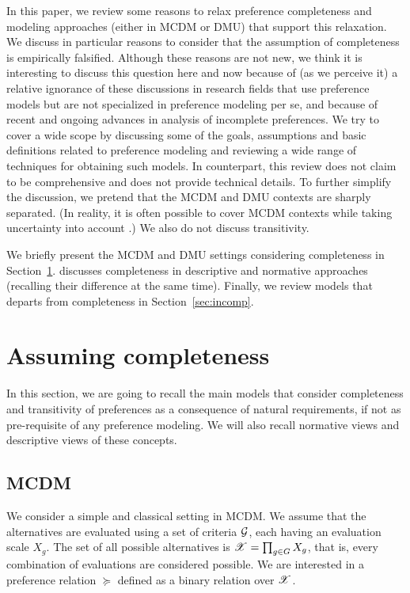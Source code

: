 \documentclass[french, english]{llncs}
\begin{document}
In this paper, we review some reasons to relax preference completeness and modeling approaches (either in MCDM or DMU) that support this relaxation. We discuss in particular reasons to consider that the assumption of completeness is empirically falsified. Although these reasons are not new, we think it is interesting to discuss this question here and now because of (as we perceive it) a relative ignorance of these discussions in research fields that use preference models but are not specialized in preference modeling per se, and because of recent and ongoing advances in analysis of incomplete preferences.
We try to cover a wide scope by discussing some of the goals, assumptions and basic definitions related to preference modeling and reviewing a wide range of techniques for obtaining such models. In counterpart, this review does not claim to be comprehensive and does not provide technical details. To further simplify the discussion, we pretend that the MCDM and DMU contexts are sharply separated. (In reality, it is often possible to cover MCDM contexts while taking uncertainty into account \citep{keeney_decisions_1993}.) We also do not discuss transitivity.

We briefly present the MCDM and DMU settings considering completeness in Section~\ref{sec:review}.  discusses completeness in descriptive and normative approaches (recalling their difference at the same time). Finally, we review models that departs from completeness in Section~\ref{sec:incomp}.
	
\section{Assuming completeness}\label{sec:review}
In this section, we are going to recall the main models that consider completeness and transitivity of preferences as a consequence of natural requirements, if not as pre-requisite of any preference modeling. We will also recall normative views and descriptive views of these concepts. 
	
\subsection{MCDM}
We consider a simple and classical setting in MCDM. We assume that the alternatives are evaluated using a set of criteria $\mathcal{G}$, each having an evaluation scale $X_g$. The set of all possible alternatives is $\mathscr{X} = \prod_{g \in G} X_g$, that is, every combination of evaluations are considered possible. 
We are interested in a preference relation $\succeq$ defined as a binary relation over $\mathscr{X}$.
\end{document}
